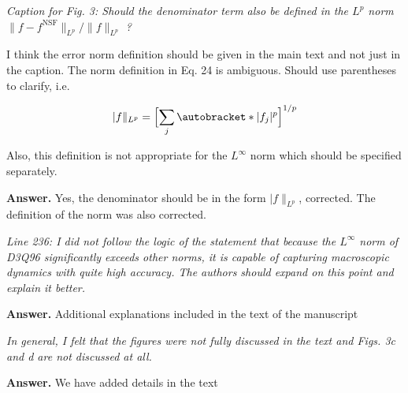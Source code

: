 \documentclass{article}
\DeclarePairedDelimiter\autobracket()       %
\newcommand{\br}[1]{\autobracket*{#1}}
\begin{document}
{\it Caption for Fig. 3: Should the denominator term also be defined in the $ L^p$
 norm \(\|f-f^{\mathrm{NSF}}\|_{L^p}/\|f\|_{L^p}\) ?

I think the error norm definition should be given in the main text and not just in the caption. The
norm definition in Eq. 24 is ambiguous. Should use parentheses to clarify, i.e.  
  
  $$
  |f\|_{L^p} = \Bigl[\sum_j \br|f_j|^p \Bigr]^{1/p}
  $$
 
  Also, this definition is not appropriate for the $L^{\infty}$
 norm which should be specified separately.
}

{\bf Answer.}  Yes, the denominator should be in the  form $|f\|_{L^p}$, corrected.  The  definition of the  norm was  also corrected.


{\it Line 236: I did not follow the logic of the statement that because the $L^{\infty}$ norm of D3Q96
significantly exceeds other norms, it is capable of capturing macroscopic dynamics with quite
high accuracy. The authors should expand on this point and explain it better. 
 }
 
{\bf Answer.} Additional explanations  included in the text of the manuscript
 
 {\it In general, I felt that the figures were not fully discussed in the text and Figs. 3c and d are not discussed at all. }
 
 {\bf Answer.}  We have added details in the text
 
\end{document}
